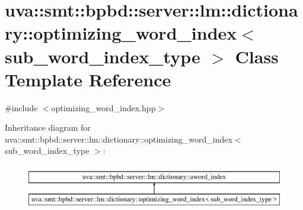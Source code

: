 \hypertarget{classuva_1_1smt_1_1bpbd_1_1server_1_1lm_1_1dictionary_1_1optimizing__word__index}{}\section{uva\+:\+:smt\+:\+:bpbd\+:\+:server\+:\+:lm\+:\+:dictionary\+:\+:optimizing\+\_\+word\+\_\+index$<$ sub\+\_\+word\+\_\+index\+\_\+type $>$ Class Template Reference}
\label{classuva_1_1smt_1_1bpbd_1_1server_1_1lm_1_1dictionary_1_1optimizing__word__index}


{\ttfamily \#include $<$optimizing\+\_\+word\+\_\+index.\+hpp$>$}

Inheritance diagram for uva\+:\+:smt\+:\+:bpbd\+:\+:server\+:\+:lm\+:\+:dictionary\+:\+:optimizing\+\_\+word\+\_\+index$<$ sub\+\_\+word\+\_\+index\+\_\+type $>$\+:\begin{figure}[H]
\begin{center}
\leavevmode
\includegraphics[height=2.000000cm]{classuva_1_1smt_1_1bpbd_1_1server_1_1lm_1_1dictionary_1_1optimizing__word__index}
\end{center}
\end{figure}
